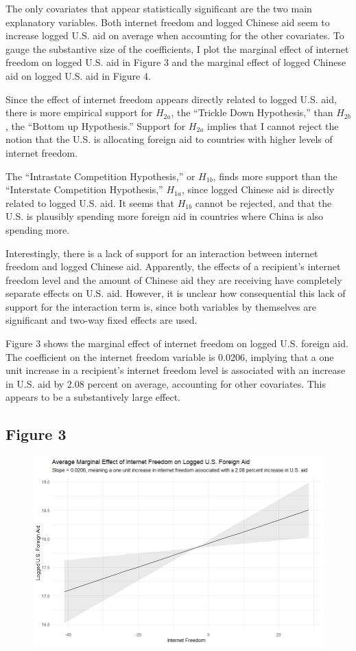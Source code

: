 \documentclass[12pt]{article}
\begin{document}
The only covariates that appear statistically significant are the two main explanatory variables. Both internet freedom and logged Chinese aid seem to increase logged U.S. aid on average when accounting for the other covariates. To gauge the substantive size of the coefficients, I plot the marginal effect of internet freedom on logged U.S. aid in Figure 3 and the marginal effect of logged Chinese aid on logged U.S. aid in Figure 4.

Since the effect of internet freedom appears directly related to logged U.S. aid, there is more empirical support for $H_{2a}$, the ``Trickle Down Hypothesis,'' than $H_{2b}$, the ``Bottom up Hypothesis.'' Support for $H_{2a}$ implies that I cannot reject the notion that the U.S. is allocating foreign aid to countries with higher levels of internet freedom.

The ``Intrastate Competition Hypothesis,'' or $H_{1b}$, finds more support than the ``Interstate Competition Hypothesis,'' $H_{1a}$, since logged Chinese aid is directly related to logged U.S. aid. It seems that $H_{1b}$ cannot be rejected, and that the U.S. is plausibly spending more foreign aid in countries where China is also spending more.

Interestingly, there is a lack of support for an interaction between internet freedom and logged Chinese aid. Apparently, the effects of a recipient's internet freedom level and the amount of Chinese aid they are receiving have completely separate effects on U.S. aid. However, it is unclear how consequential this lack of support for the interaction term is, since both variables by themselves are significant and two-way fixed effects are used.

\pagebreak
Figure 3 shows the marginal effect of internet freedom on logged U.S. foreign aid. The coefficient on the internet freedom variable is 0.0206, implying that a one unit increase in a recipient's internet freedom level is associated with an increase in U.S. aid by 2.08 percent on average, accounting for other covariates. This appears to be a substantively large effect.

\subsection*{Figure 3}
\begin{figure}[htbp]
    \includegraphics[scale=0.7]{628plot1.png}
\end{figure}
\end{document}
